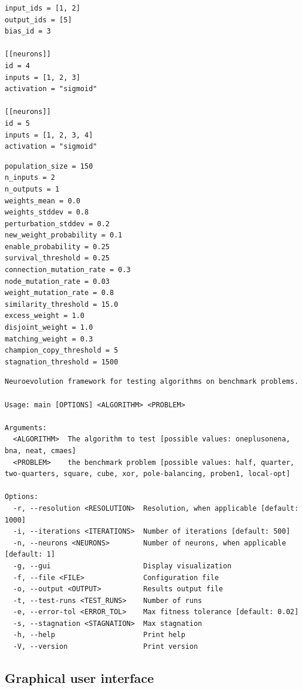 \begin{lstlisting}[label=verb:cmaes_config,caption=Example of configuration File for CMAE-ES,float,frame=tb]
input_ids = [1, 2]
output_ids = [5]
bias_id = 3

[[neurons]]
id = 4
inputs = [1, 2, 3]
activation = "sigmoid"

[[neurons]]
id = 5
inputs = [1, 2, 3, 4]
activation = "sigmoid"
\end{lstlisting}

\begin{lstlisting}[label=verb:neat_config,caption=Example of configuration File for NEAT,float,frame=tb]
population_size = 150
n_inputs = 2
n_outputs = 1
weights_mean = 0.0
weights_stddev = 0.8
perturbation_stddev = 0.2
new_weight_probability = 0.1
enable_probability = 0.25
survival_threshold = 0.25
connection_mutation_rate = 0.3
node_mutation_rate = 0.03
weight_mutation_rate = 0.8
similarity_threshold = 15.0
excess_weight = 1.0
disjoint_weight = 1.0
matching_weight = 0.3
champion_copy_threshold = 5
stagnation_threshold = 1500
\end{lstlisting}

\begin{lstlisting}[label=verb:cli,caption=Command line interface,float,frame=tb]
Neuroevolution framework for testing algorithms on benchmark problems.

Usage: main [OPTIONS] <ALGORITHM> <PROBLEM>

Arguments:
  <ALGORITHM>  The algorithm to test [possible values: oneplusonena, bna, neat, cmaes]
  <PROBLEM>    the benchmark problem [possible values: half, quarter, two-quarters, square, cube, xor, pole-balancing, proben1, local-opt]

Options:
  -r, --resolution <RESOLUTION>  Resolution, when applicable [default: 1000]
  -i, --iterations <ITERATIONS>  Number of iterations [default: 500]
  -n, --neurons <NEURONS>        Number of neurons, when applicable [default: 1]
  -g, --gui                      Display visualization
  -f, --file <FILE>              Configuration file
  -o, --output <OUTPUT>          Results output file
  -t, --test-runs <TEST_RUNS>    Number of runs
  -e, --error-tol <ERROR_TOL>    Max fitness tolerance [default: 0.02]
  -s, --stagnation <STAGNATION>  Max stagnation
  -h, --help                     Print help
  -V, --version                  Print version
\end{lstlisting}

\subsection{Graphical user interface}

